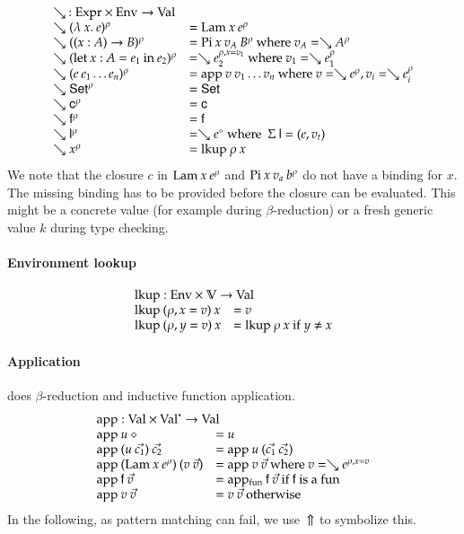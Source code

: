 \[
\begin{array}{ll}
\multicolumn{2}{l}{\wh \: : \Expr \times \Env \ra \Val}\\
\wh \clp{\lam{x}{e}}{\rho} & = \vlam \: x \: \cl{e}{\rho} \\
\wh \clp{\EPi{x}{A}{B}}{\rho} &= \vpi \: x \: v_A \: \cl{B}{\rho} \mbox{ where } v_A = \wh \cl{A}{\rho} \\
\wh \clp{\ELet{x}{A}{e_1}{e_2}}{\rho} &= \wh \cl{e_2}{\ins{\rho}{x}{v_1}} \mbox { where } v_1 = \wh \cl{e_1}{\rho} \\
\wh \clp{e \: e_1 \ldots e_n}{\rho} &= \ap \: v \: v_1 \ldots v_n \mbox{ where } v = \wh \cl{e}{\rho} , v_i = \wh \cl{e_i}{\rho}\\
\wh \cl{\Set}{\rho} & = \Set \\ 
\wh \cl{\cc}{\rho} & = \cc  \\
\wh \cl{\ff}{\rho} & = \ff \\
\wh \cl{\dd}{\rho} & = \wh \cl{e}{\diamond} \mbox{ where } \: \Sig \: \dd = (e,v_t)\\
\wh \cl{x}{\rho} & = \lkup \: \rho \: x \\
\end{array}
\]
We note that the closure $c$  in $\mathrm{Lam} \: x \: e^{\rho}$
and $\mathrm{Pi} \: x \: v_a \: b^{\rho}$ do not have a binding for $x$.
The missing binding has to be provided before the closure can be evaluated.
This might be a concrete value (for example during $\beta$-reduction) or a
fresh generic value $k$ during type checking.

\paragraph*{Environment lookup}
\[
\begin{array}{ll}
\multicolumn{2}{l}{\lkup : \Env \times \cV \ra \Val }\\
\lkup \: (\ins{\rho}{x}{v}) \: x & = v \\
\lkup \: (\ins{\rho}{y}{v}) \: x & = \lkup \: \rho \: x \mbox{ if } y \neq x  
\end{array}
\]

\paragraph*{Application}
does $\beta$-reduction and inductive function application. 
\[
\begin{array}{ll}
\multicolumn{2}{l}{\ap : \Val \times \ves{\Val} \ra \Val}\\
\ap \: u \: \diamond & = u \\
\ap \: (u \: \vec{c_1}) \: \vec{c_2} & = \ap \: u \: (\vec{c_1}\:\vec{c_2})\\
\ap \: (\vlam \: x \: \cl{e}{\rho}) \: (v \: \vec{v}) & = \ap \: v \: \vec{v} \mbox{ where } v = \wh \cl{e}{\ins{\rho}{x}{v}} \\ 
\ap \: \ff \: \vec{v} & = \apf \: \ff \: \vec{v} \mbox{ if } \ff \mbox{ is a } \fun \\ 
\ap \: v \: \vec{v} & = v \: \vec{v} \mbox{ otherwise } \\
\end{array}
\]
In the following, as pattern matching can fail, we use $\:\Uparrow$ to symbolize this. 
